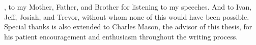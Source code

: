 
, to my Mother, Father, and Brother for listening to my speeches. And to Ivan, Jeff, Josiah, and Trevor, without whom none of this would have been possible. Special thanks is also extended to Charles Mason, the advisor of this thesis, for his patient encouragement and enthusiasm throughout the writing process.